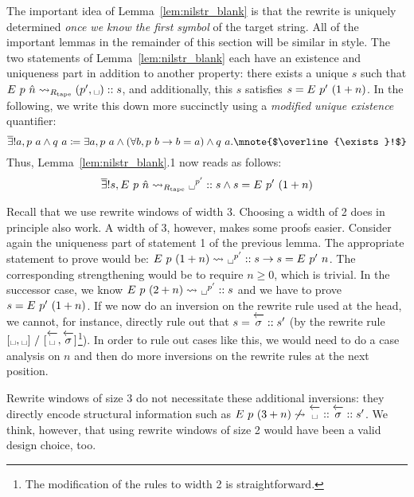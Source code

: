 The important idea of Lemma~\ref{lem:nilstr_blank} is that the rewrite is uniquely determined \emph{once we know the first symbol} of the target string. All of the important lemmas in the remainder of this section will be similar in style.
\newcommand{\mexists}{\overline{\exists}!}
The two statements of Lemma~\ref{lem:nilstr_blank} each have an existence and uniqueness part in addition to another property: there exists a unique $s$ such that $\nilstr{p}{\hat{n}} \strent{\Rtape} (p', \blank) :: s$, and additionally, this $s$ satisfies $s = E~p'~(1 +{n})$. In the following, we write this down more succinctly using a \emph{modified unique existence} quantifier:
\[\mexists a, p~a \land q~a \defeq \exists a, p~a \land (\forall b, p~b \rightarrow b = a) \land q~a. \mnote{$\mexists$}\]
Thus, Lemma~\ref{lem:nilstr_blank}.1 now reads as follows: 
\[\mexists s, \nilstr{p}{\hat{n}} \strent{\Rtape} \blank^{p'} :: s \land s = \nilstr{p'}{(\natS{n})}\]

\begin{remark}
  Recall that we use rewrite windows of width 3. Choosing a width of 2 does in principle also work. 
  A width of 3, however, makes some proofs easier. Consider again the uniqueness part of statement 1 of the previous lemma. 
  The appropriate statement to prove would be: $\nilstr{p}{(\natS{n})} \strent{} \blank^{p'} :: s \rightarrow s = \nilstr{p'}{n}$. The corresponding strengthening would be to require $n \ge 0$, which is trivial. 
  In the successor case, we know $\nilstr{p}{(2 + n)} \strent{} \blank^{p'} :: s$ and we have to prove $s = E~p'~(1 + n)$. If we now do an inversion on the rewrite rule used at the head, we cannot, for instance, directly rule out that $s = \polneg{\sigma} :: s'$ (by the rewrite rule $[\blank, \blank]~/~[\polneg{\blank}, \polneg{\sigma}]$\footnote{The modification of the rules to width 2 is straightforward.}). In order to rule out cases like this, we would need to do a case analysis on $n$ and then do more inversions on the rewrite rules at the next position. 

  Rewrite windows of size 3 do not necessitate these additional inversions: they directly encode structural information such as $\nilstr{p}{(3+n)} \not\strent{} \polneg{\blank} :: \polneg{\sigma} :: s'$. 
  We think, however, that using rewrite windows of size 2 would have been a valid design choice, too.
\end{remark}

